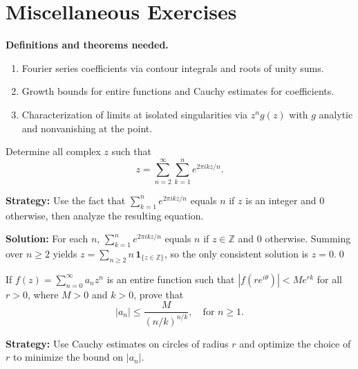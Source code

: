\section{Miscellaneous Exercises}

\noindent\textbf{Definitions and theorems needed.}
\begin{enumerate}[label=(\alph*)]
\item Fourier series coefficients via contour integrals and roots of unity sums.
\item Growth bounds for entire functions and Cauchy estimates for coefficients.
\item Characterization of limits at isolated singularities via $z^n g(z)$ with $g$ analytic and nonvanishing at the point.
\end{enumerate}



\begin{problembox}
\begin{problemstatement}
Determine all complex \( z \) such that
\[ z = \sum_{n=2}^{\infty} \sum_{k=1}^{n} e^{2\pi i k z / n}. \]
\end{problemstatement}
\end{problembox}

\noindent\textbf{Strategy:} Use the fact that \( \sum_{k=1}^n e^{2\pi i k z/n} \) equals \( n \) if \( z \) is an integer and \( 0 \) otherwise, then analyze the resulting equation.

\bigskip\noindent\textbf{Solution:}
For each $n$, $\sum_{k=1}^n e^{2\pi i k z/n}$ equals $n$ if $z\in\mathbb Z$ and $0$ otherwise. Summing over $n\ge2$ yields $z=\sum_{n\ge2} n\,\mathbf 1_{\{z\in\mathbb Z\}}$, so the only consistent solution is $z=0$.\qed


\begin{problembox}
\begin{problemstatement}
If \( f(z) = \sum_{n=0}^{\infty} a_n z^n \) is an entire function such that \( |f(r e^{i\theta})| < M e^{r k} \) for all \( r > 0 \), where \( M > 0 \) and \( k > 0 \), prove that
\[ |a_n| \leq \frac{M}{(n/k)^{n/k}}, \quad \text{for } n \geq 1. \]
\end{problemstatement}
\end{problembox}

\noindent\textbf{Strategy:} Use Cauchy estimates on circles of radius \( r \) and optimize the choice of \( r \) to minimize the bound on \( |a_n| \).

